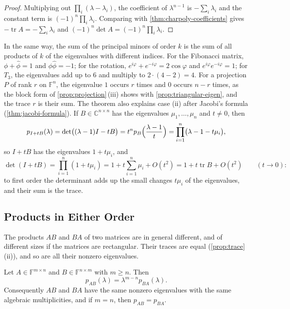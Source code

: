 \begin{proof}
Multiplying out $\prod_i(\lambda-\lambda_i)$, the coefficient of $\lambda^{n-1}$ is $-\sum_i\lambda_i$ and the constant term is $(-1)^n\prod_i\lambda_i$. Comparing with \cref{thm:charpoly-coefficients} gives $-\operatorname{tr}A=-\sum_i\lambda_i$ and $(-1)^n\det A=(-1)^n\prod_i\lambda_i$.
\end{proof}

In the same way, the sum of the principal minors of order $k$ is the sum of all products of $k$ of the eigenvalues with different indices. For the Fibonacci matrix, $\phi+\hat\phi=1$ and $\phi\hat\phi=-1$; for the rotation, $e^{i\varphi}+e^{-i\varphi}=2\cos\varphi$ and $e^{i\varphi}e^{-i\varphi}=1$; for $T_3$, the eigenvalues add up to $6$ and multiply to $2\cdot(4-2)=4$. For a projection $P$ of rank $r$ on $\mathbb F^n$, the eigenvalue $1$ occurs $r$ times and $0$ occurs $n-r$ times, as the block form of \cref{prop:projection}\,(iii) shows with \cref{prop:triangular-eigen}, and the trace $r$ is their sum. The theorem also explains case (ii) after Jacobi's formula (\cref{thm:jacobi-formula}). If $B\in\mathbb C^{n\times n}$ has the eigenvalues $\mu_1,\ldots,\mu_n$ and $t\ne0$, then
\[
p_{I+tB}(\lambda)=\det\bigl((\lambda-1)I-tB\bigr)=t^np_B\Bigl(\frac{\lambda-1}t\Bigr)=\prod_{i=1}^n\bigl(\lambda-1-t\mu_i\bigr),
\]
so $I+tB$ has the eigenvalues $1+t\mu_i$, and
\[
\det(I+tB)=\prod_{i=1}^n(1+t\mu_i)=1+t\sum_{i=1}^n\mu_i+O(t^2)=1+t\operatorname{tr}B+O(t^2)\qquad(t\to0):
\]
to first order the determinant adds up the small changes $t\mu_i$ of the eigenvalues, and their sum is the trace.

\subsection{Products in Either Order}

The products $AB$ and $BA$ of two matrices are in general different, and of different sizes if the matrices are rectangular. Their traces are equal (\cref{prop:trace}\,(ii)), and so are all their nonzero eigenvalues.

\begin{theorem}
\label{thm:ab-ba}
Let $A\in\mathbb F^{m\times n}$ and $B\in\mathbb F^{n\times m}$ with $m\ge n$. Then
\[
p_{AB}(\lambda)=\lambda^{m-n}p_{BA}(\lambda).
\]
Consequently $AB$ and $BA$ have the same nonzero eigenvalues with the same algebraic multiplicities, and if $m=n$, then $p_{AB}=p_{BA}$.
\end{theorem}

